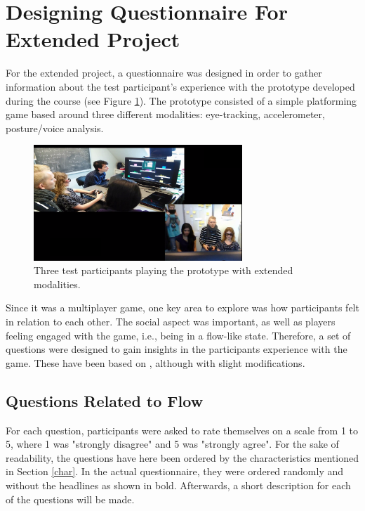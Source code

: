 \section{Designing Questionnaire For Extended Project} \label{qustionnaire}
For the extended project, a questionnaire was designed in order to gather information about the test participant's experience with the prototype developed during the course (see Figure \ref{fig:prototype}). The prototype consisted of a simple platforming game based around three different modalities: eye-tracking, accelerometer, posture/voice analysis.

\begin{figure}[htbp]
\centering
\includegraphics[width=0.70\textwidth]{Pictures/extended_modality}
\caption{Three test participants playing the prototype with extended modalities.}
\label{fig:prototype}
\end{figure}

Since it was a multiplayer game, one key area to explore was how participants felt in relation to each other. The social aspect was important, as well as players feeling engaged with the game, i.e., being in a flow-like state. Therefore, a set of questions were designed to gain insights in the participants experience with the game. These have been based on \cite{imiOne}, although with slight modifications.

\subsection{Questions Related to Flow}
For each question, participants were asked to rate themselves on a scale from 1 to 5, where 1 was "strongly disagree" and 5 was "strongly agree". For the sake of readability, the questions have here been ordered by the characteristics mentioned in Section \ref{char}. In the actual questionnaire, they were ordered randomly and without the headlines as shown in bold. Afterwards, a short description for each of the questions will be made.

